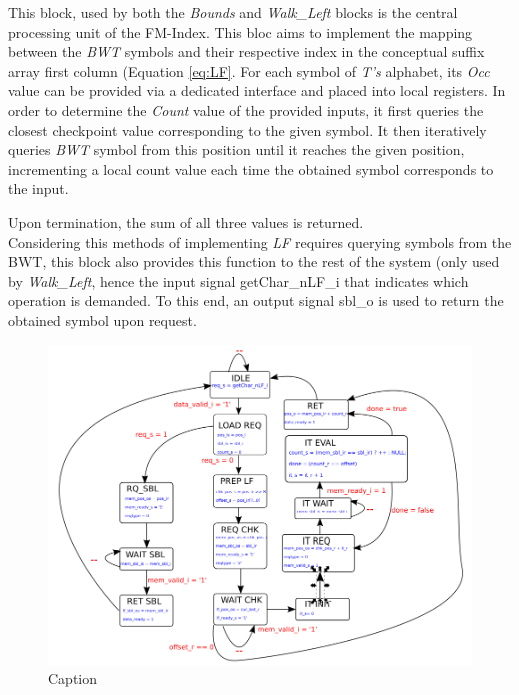 This block, used by both the \textsl{Bounds} and \textsl{Walk\_Left} blocks is the central processing unit of the FM-Index. This bloc aims to implement the mapping between the \textsl{BWT} symbols and their respective index in the conceptual suffix array first column (Equation \ref{eq:LF}. For each symbol of \textsl{T's} alphabet, its \textsl{Occ} value can be provided via a dedicated interface and placed into local registers. In order to determine the \textsl{Count} value of the provided inputs, it first queries the closest checkpoint value corresponding to the given symbol. It then iteratively queries \textsl{BWT} symbol from this position until it reaches the given position, incrementing a local count value each time the obtained symbol corresponds to the input.

Upon termination, the sum of all three values is returned. \\

Considering this methods of implementing \textsl{LF} requires querying symbols from the BWT, this block also provides this function to the rest of the system (only used by \textsl{Walk\_Left}, hence the input signal \textrm{getChar\_nLF\_i} that indicates which operation is demanded. To this end, an output signal \textrm{sbl\_o} is used to return the obtained symbol upon request.

\begin{figure}[H]
    \centering
\hspace*{-20mm}\includegraphics[scale = 0.5]{Figures/LF_FSM.png}
    \caption{Caption}
    \label{fig:lf_fsm}
\end{figure}
\vspace*{8mm}



